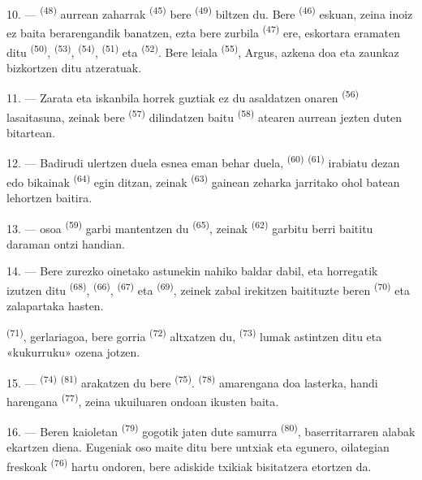 10. ---  \textsuperscript{(48)} aurrean 
zaharrak \textsuperscript{(45)} bere  \textsuperscript{(49)}
biltzen du. Bere  \textsuperscript{(46)} eskuan, zeina inoiz ez
baita berarengandik banatzen, ezta bere  zurbila
\textsuperscript{(47)} ere, eskortara eramaten ditu 
\textsuperscript{(50)},  \textsuperscript{(53)},
 \textsuperscript{(54)}, 
\textsuperscript{(51)} eta  \textsuperscript{(52)}. Bere
 leiala \textsuperscript{(55)}, Argus, azkena doa eta zaunkaz
bizkortzen ditu atzeratuak.

11. --- Zarata eta iskanbila horrek guztiak ez du asaldatzen 
onaren \textsuperscript{(56)} lasaitasuna, zeinak bere 
\textsuperscript{(57)} dilindatzen baitu 
\textsuperscript{(58)} atearen aurrean jezten duten bitartean.

12. --- Badirudi ulertzen duela esnea eman behar duela,  \textsuperscript{(60)}  
\textsuperscript{(61)} irabiatu dezan edo  bikainak
\textsuperscript{(64)} egin ditzan, zeinak 
\textsuperscript{(63)} gainean zeharka jarritako ohol batean lehortzen baitira.

13. ---  osoa \textsuperscript{(59)} garbi mantentzen du
 \textsuperscript{(65)}, zeinak 
\textsuperscript{(62)} garbitu berri baititu daraman ontzi handian.

\VUsaut{3.0mm}
\VUsaut{3.0mm}

14. --- Bere zurezko oinetako astunekin nahiko baldar dabil, eta horregatik
izutzen ditu  \textsuperscript{(68)}, 
\textsuperscript{(66)},  \textsuperscript{(67)} eta
 \textsuperscript{(69)}, zeinek zabal irekitzen baitituzte beren
 \textsuperscript{(70)} eta zalapartaka hasten.

 \textsuperscript{(71)}, gerlariagoa, bere 
gorria \textsuperscript{(72)} altxatzen du, 
\textsuperscript{(73)} lumak astintzen ditu eta «kukurruku» ozena jotzen.

15. ---  \textsuperscript{(74)} 
\textsuperscript{(81)} arakatzen du bere 
\textsuperscript{(75)}.  \textsuperscript{(78)} amarengana
doa lasterka,  handi harengana \textsuperscript{(77)}, zeina
ukuiluaren ondoan ikusten baita.

16. --- Beren kaioletan  \textsuperscript{(79)} gogotik jaten
dute  samurra \textsuperscript{(80)}, baserritarraren alabak
ekartzen diena. Eugeniak oso maite ditu bere untxiak eta egunero, oilategian
 freskoak \textsuperscript{(76)} hartu ondoren, bere adiskide
txikiak bisitatzera etortzen da.
\VUsaut{6.0mm}
\VUfilet{22mm}

